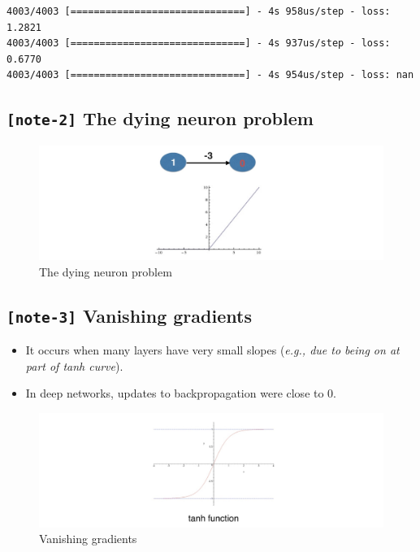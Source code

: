\documentclass[11pt, twoside]{article}
\begin{document}
    \begin{Verbatim}[commandchars=\\\{\}]
4003/4003 [==============================] - 4s 958us/step - loss: 1.2821
4003/4003 [==============================] - 4s 937us/step - loss: 0.6770
4003/4003 [==============================] - 4s 954us/step - loss: nan
    \end{Verbatim}

    \hypertarget{note-2-the-dying-neuron-problem}{%
\subsection{\texorpdfstring{\texttt{{[}note-2{]}} The dying neuron
problem}{{[}note-2{]} The dying neuron problem}}\label{note-2-the-dying-neuron-problem}}

\begin{figure}
\centering
\includegraphics{../Figures/1. The dying neuron problem.jpg}
\caption{The dying neuron problem}
\end{figure}

    \hypertarget{note-3-vanishing-gradients}{%
\subsection{\texorpdfstring{\texttt{{[}note-3{]}} Vanishing
gradients}{{[}note-3{]} Vanishing gradients}}\label{note-3-vanishing-gradients}}

\begin{itemize}
\item
  It occurs when many layers have very small slopes (\emph{e.g., due to
  being on at part of tanh curve}).
\item
  In deep networks, updates to backpropagation were close to 0.
\end{itemize}

\begin{figure}
\centering
\includegraphics{../Figures/2. Vanishing gradient.jpg}
\caption{Vanishing gradients}
\end{figure}
\end{document}
